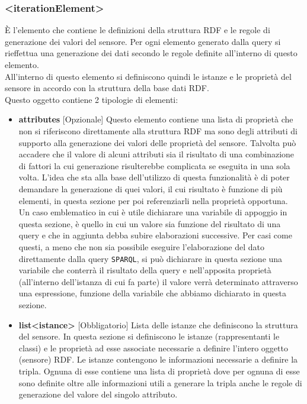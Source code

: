 \documentclass[12pt,a4paper,italian]{article}
\begin{document}
\subsubsection{<iterationElement>}\label{itarationelement}
\`E l'elemento che contiene le definizioni della struttura RDF e le regole di generazione dei valori del sensore. Per ogni elemento generato dalla query si
rieffettua una generazione dei dati secondo le regole definite all'interno di questo elemento.\\
All'interno di questo elemento si definiscono quindi le istanze e le proprietà del sensore in accordo con la struttura della base dati RDF.\\
Questo oggetto contiene 2 tipologie di elementi:
\begin{itemize}
	\item \textbf{attributes} [Opzionale] Questo elemento contiene una lista di proprietà che non si riferiscono direttamente alla struttura RDF ma sono degli attributi 
	di supporto alla generazione dei valori delle proprietà del sensore. Talvolta può accadere che il valore di alcuni attributi sia il risultato di una combinazione di fattori la cui generazione 
	risulterebbe complicata se eseguita in una sola volta. L'idea che sta alla base dell'utilizzo di questa funzionalità è di poter demandare la generazione di quei valori, il cui risultato è funzione di più elementi,
	in questa sezione per poi referenziarli nella proprietà opportuna.\\
	Un caso emblematico in cui è utile dichiarare una variabile di appoggio in questa sezione, è quello in cui un valore sia funzione del risultato di una query e che in aggiunta debba subire elaborazioni successive. Per casi come questi, a meno che non sia possibile eseguire l'elaborazione del dato direttamente dalla query \texttt{SPARQL}, si può dichiarare in questa sezione una variabile che conterrà il risultato della query e nell'apposita proprietà (all'interno dell'istanza di cui fa parte) il valore verrà determinato attraverso una espressione, funzione della variabile che abbiamo dichiarato in questa sezione.
	\item \textbf{list<istance>} [Obbligatorio] Lista delle istanze che definiscono la struttura del sensore. In questa sezione si definiscono le istanze (rappresentanti le classi) e 
	le proprietà ad esse associate necessarie a definire l'intero oggetto (sensore) RDF. Le istanze contengono le informazioni necessarie a definire la tripla. Ognuna di esse contiene 
	una lista di proprietà dove per ognuna di esse sono definite oltre alle informazioni utili a generare la tripla anche le regole di generazione del valore del singolo attributo.
\end{itemize} 
\end{document}
